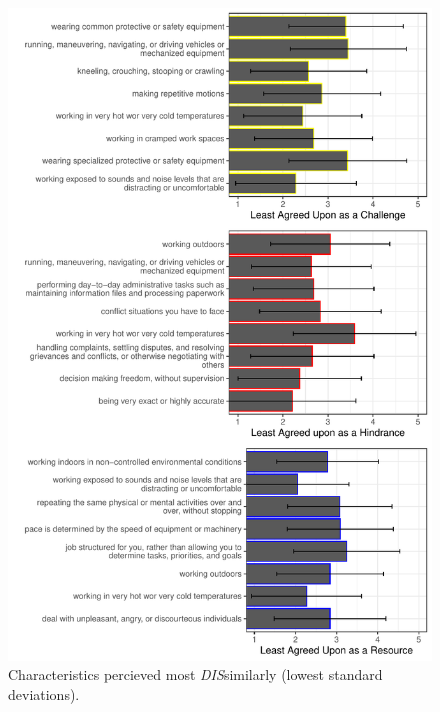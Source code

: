 \documentclass[
  english,
  man]{apa6}
\begin{document}
\begin{figure}
\centering
\includegraphics{Submission_files/figure-latex/combinegraphs2-1.pdf}
\caption{\label{fig:combinegraphs2}Characteristics percieved most \emph{DIS}similarly (lowest standard deviations).}
\end{figure}
\end{document}
